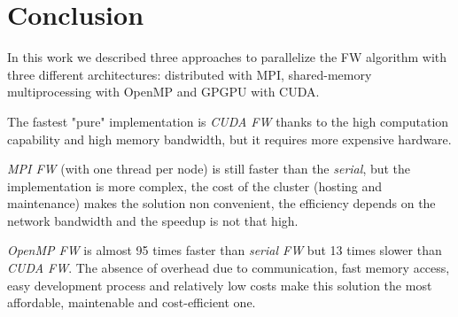 \section*{Conclusion}

In this work we described three approaches to parallelize the FW algorithm with three different architectures:
distributed with MPI, shared-memory multiprocessing with OpenMP and GPGPU with CUDA.

The fastest "pure" implementation is \emph{CUDA FW} thanks to the high computation capability and high memory bandwidth, 
but it requires more expensive hardware. 

\emph{MPI FW} (with one thread per node)  is still faster than the \emph{serial}, but the implementation
is more complex, the cost of the cluster (hosting and maintenance) makes the solution non convenient,
the efficiency depends on the network bandwidth and the speedup is not that high.

\emph{OpenMP FW} is almost 95 times faster than \emph{serial FW} but 13 times slower than \emph{CUDA FW}. The absence of
overhead due to communication, fast memory access, easy development process and relatively low costs make this solution the
most affordable, maintenable and cost-efficient one.